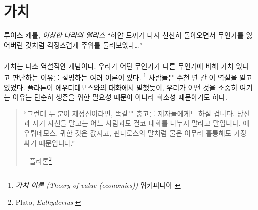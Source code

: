 \chapter{가치}
\label{les:10}

\begin{chapquote}{루이스 캐롤, \textit{이상한 나라의 앨리스}}
	\enquote{하얀 토끼가 다시 천천히 돌아오면서 무언가를 잃어버린 것처럼 걱정스럽게 주위를 둘러보았다\ldots}
\end{chapquote}

\paragraph{}
가치는 다소 역설적인 개념이다. 
우리가 어떤 무언가가 다른 무언가에 비해 가치 있다고 판단하는 이유를 설명하는 여러 이론이 있다.
\footnote{\textit{가치 이론 (Theory of value (economics))} 위키피디아 \cite{wiki:theory-of-value}}
사람들은 수천 년 간 이 역설을 알고 있었다. 
플라톤이 에우티데모스와의 대화에서 말했듯이, 우리가 어떤 것을 소중히 여기는 이유는 단순히 생존을 위한 필요성 때문이 아니라
희소성 때문이기도 하다.

\begin{quotation}\begin{samepage}
		\enquote{그런데 두 분이 제정신이라면, 똑같은 충고를 제자들에게도 하실 겁니다.
			당신과 자기 자신들 말고는 어느 사람과도 결코 대화를 나누지 말라고 말입니다.
			에우튀데모스, 귀한 것은 값지고, 핀다로스의 말처럼 물은 아무리 훌륭해도 가장 싸기 때문입니다.}
		\begin{flushright} -- 플라톤\footnote{Plato, \textit{Euthydemus} \cite{euthydemus}}
\end{flushright}\end{samepage}\end{quotation}


